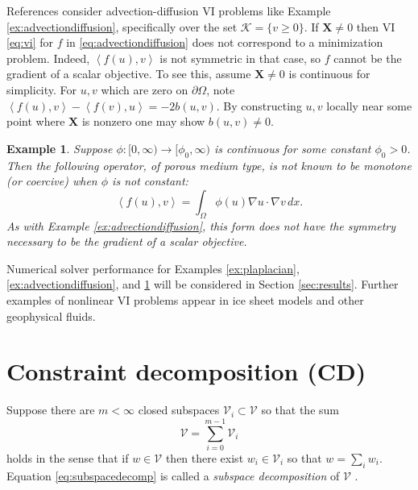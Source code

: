 \documentclass[letterpaper,final,12pt,reqno]{amsart}
\theoremstyle{cstyle}
\theoremstyle{cstyle*}
\theoremstyle{dstyle}
\newtheorem{example}[theorem]{Example}
\numberwithin{equation}{section}
\numberwithin{figure}{section}
\numberwithin{table}{section}
\numberwithin{theorem}{section}
\newcommand{\grad}{\nabla}
\newcommand{\bX}{\mathbf{X}}
\newcommand{\cK}{\mathcal{K}}
\newcommand{\cV}{\mathcal{V}}
\newcommand{\ip}[2]{\left<#1,#2\right>}
\begin{document}
References \cite{Bueler2021conservation,ChangNakshatrala2017} consider advection-diffusion VI problems like Example \ref{ex:advectiondiffusion}, specifically over the set $\cK = \{v\ge 0\}$.  If $\bX \ne 0$ then VI \eqref{eq:vi} for $f$ in \eqref{eq:advectiondiffusion} does not correspond to a minimization problem.  Indeed, $\ip{f(u)}{v}$ is not symmetric in that case, so $f$ cannot be the gradient of a scalar objective.  To see this, assume $\bX \ne 0$ is continuous for simplicity.  For $u,v$ which are zero on $\partial \Omega$, note $\ip{f(u)}{v} - \ip{f(v)}{u} = -2 b(u,v)$.  By constructing $u,v$ locally near some point where $\bX$ is nonzero one may show $b(u,v)\ne 0$.

\begin{example}  \label{ex:porous}  Suppose $\phi:[0,\infty) \to [\phi_0,\infty)$ is continuous for some constant $\phi_0>0$.  Then the following operator, of porous medium type, is not known to be monotone (or coercive) when $\phi$ is not constant:
\begin{equation}
\ip{f(u)}{v} = \int_\Omega \phi(u) \grad u \cdot \grad v\,dx. \label{eq:porous}
\end{equation}
As with Example \ref{ex:advectiondiffusion}, this form does not have the symmetry necessary to be the gradient of a scalar objective.
\end{example}

Numerical solver performance for Examples \ref{ex:plaplacian}, \ref{ex:advectiondiffusion}, and \ref{ex:porous} will be considered in Section \ref{sec:results}.  Further examples of nonlinear VI problems appear in ice sheet models \cite{Calvoetal2002,JouvetBueler2012} and other geophysical fluids.


\section{Constraint decomposition (CD)} \label{sec:cd}

Suppose there are $m<\infty$ closed subspaces $\cV_i \subset \cV$ so that the sum
\begin{equation}
\cV = \sum_{i=0}^{m-1} \cV_i \label{eq:subspacedecomp}
\end{equation}
holds in the sense that if $w \in \cV$ then there exist $w_i \in \cV_i$ so that $w = \sum_i w_i$.  Equation \eqref{eq:subspacedecomp} is called a \emph{subspace decomposition} of $\cV$ \cite{Xu1992}.
\end{document}
